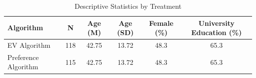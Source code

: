 \begin{table}[htbp]
\centering
\caption{Descriptive Statistics by Treatment}
\begin{tabular}{lccccc}
\toprule
Algorithm & N & Age (M) & Age (SD) & Female (\%) & University Education (\%) \\
\midrule
EV Algorithm & 118 & 42.75 & 13.72 & 48.3 & 65.3 \\
Preference Algorithm & 115 & 42.75 & 13.72 & 48.3 & 65.3 \\
\bottomrule
\end{tabular}
\label{tab:descriptive}
\end{table}